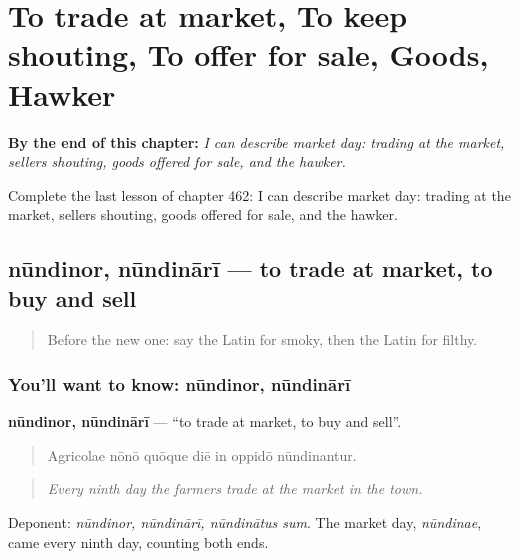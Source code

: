 
\chapter{To trade at market, To keep shouting, To offer for sale, Goods, Hawker}
\label{ch:la-to-trade-at-market-to-keep-shouting-to-offer-for-sale-goods-hawker}

\begin{chapteropening}
\textbf{By the end of this chapter:} \emph{I can describe market day: trading at the market, sellers shouting, goods offered for sale, and the hawker.}

Complete the last lesson of chapter 462: I can describe market day: trading at the market, sellers shouting, goods offered for sale, and the hawker.
\end{chapteropening}

\section[nūndinor, nūndinārī]{nūndinor, nūndinārī — to trade at market, to buy and sell}

\label{lesson:LA-C462-nundinor}



\begin{quote}
Before the new one: say the Latin for smoky, then the Latin for filthy.
\end{quote}

\subsection*{You'll want to know: nūndinor, nūndinārī}
\textbf{nūndinor, nūndinārī} — \textquotedblleft{}to trade at market, to buy and sell\textquotedblright{}.

\begin{quote}
Agricolae nōnō quōque diē in oppidō nūndinantur.
\end{quote}

\begin{quote}
\emph{Every ninth day the farmers trade at the market in the town.}
\end{quote}

Deponent: \emph{nūndinor, nūndinārī, nūndinātus sum}. The market day, \emph{nūndinae}, came every ninth day, counting both ends.

